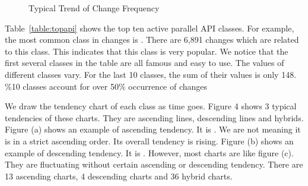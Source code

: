 %

\begin{figure}
	\centering
	\caption{Typical Trend of Change Frequency}
\end{figure}

Table~\ref{table:topapi} shows the top ten active parallel API classes.  For example, the most common class in changes is . There are 6,891 changes which are related to this class. This indicates that this class is very popular. We notice that the first several classes in the table are all famous and easy to use. The values of different classes vary. For the last 10 classes, the sum of their values is only 148. \%10 classes account for over 50\% occurrence of changes

We draw the tendency chart of each class as time goes. Figure 4 shows 3 typical tendencies of these charts. They are ascending lines, descending lines and hybrids. Figure (a) shows an example of ascending tendency. It is . We are not meaning it is in a strict ascending order. Its overall tendency is rising. Figure (b) shows an example of descending tendency. It is . However, most charts are like figure (c). They are fluctuating without certain ascending or descending tendency. There are 13 ascending charts, 4 descending charts and 36 hybrid charts.

